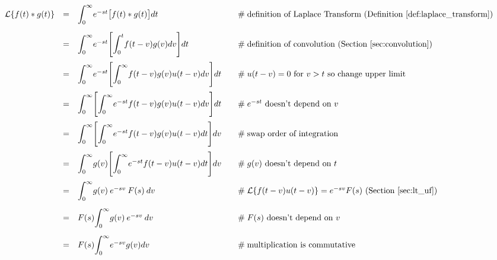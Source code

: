 \documentclass{article}
\theoremstyle{definition}
\begin{document}
\begin{equation*}
\begin{array}{lllll}
\mathcal{L}\{f(t) \ast g(t)\} 
&=& \mathlarger{\int}^\infty_0 e^{-st} \big [ f(t) \ast g(t) \big ] dt                                                                 &\quad \mathrel{\#} \text{definition of Laplace Transform (Definition \ref{def:laplace_transform})}            \\
[15pt]                 
&=& \mathlarger{\int}^\infty_0 e^{-st} \Bigg [ \mathlarger{\int}^t_0 f(t-v) g(v) dv \Bigg ] dt                         &\quad \mathrel{\#} \text{definition of convolution (Section \ref{sec:convolution})}                                     \\
[15pt]
&=& \mathlarger{\int}^\infty_0 e^{-st} \Bigg [ \mathlarger{\int}^\infty_0 f(t-v) g(v ) u(t-v) dv \Bigg ] dt        &\quad \mathrel{\#} \text{$u(t-v) = 0$ for $v > t$ so change upper limit}                                                     \\
[15pt]
&=& \mathlarger{\int}^\infty_0 \Bigg [ \mathlarger{\int}^\infty_0  e^{-st} f(t-v) g(v ) u(t-v) dv \Bigg ] dt       &\quad \mathrel{\#} \text{$e^{-st}$ doesn't depend on $v$}                                                                        \\    
[15pt]
&=& \mathlarger{\int}^\infty_0 \Bigg [ \mathlarger{\int}^\infty_0  e^{-st} f(t-v) g(v ) u(t-v) dt \Bigg ] dv       &\quad \mathrel{\#} \text{swap order of integration}                                                                                   \\    
[15pt]
&=& \mathlarger{\int}^\infty_0 g(v) \Bigg [ \mathlarger{\int}^\infty_0  e^{-st} f(t-v) u(t-v) dt \Bigg ] dv        &\quad \mathrel{\#} \text{$g(v)$ doesn't depend on $t$}                                                                             \\     
[15pt]
&=& \mathlarger{\int}^\infty_0 g(v) \: e^{-sv} \: F(s) \: dv                                                                            &\quad \mathrel{\#} \mathcal{L}\{ f(t-v) u(t-v)\} = e^{-sv} F(s) \text{ (Section \ref{sec:lt_uf})}                      \\
[15pt]
&=& F(s) \mathlarger{\int}^\infty_0 g(v) \: e^{-sv} \: dv                                                                               &\quad \mathrel{\#} \text{$F(s)$ doesn't depend on $v$}                                                                            \\
[15pt]
&=& F(s) \mathlarger{\int}^\infty_0 e^{-sv}  g(v) dv                                                                                    &\quad \mathrel{\#} \text{multiplication is commutative}                                                                              \\

\end{array}
\end{equation*}
\end{document}
